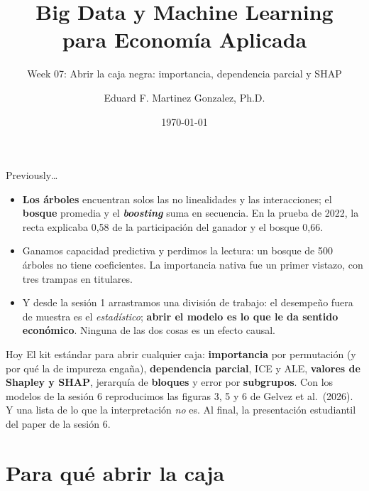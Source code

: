 \documentclass{beamer}
\title[BDML]{Big Data y Machine Learning \\ para Economía Aplicada}
\subtitle{Week 07: Abrir la caja negra: importancia, dependencia parcial y SHAP}
\author{Eduard F. Martinez Gonzalez, Ph.D.}
\institute[]{Departamento de Economía, Universidad Icesi}
\date{\today}
\newcommand{\1}{\mathbb{I}}
\begin{document}
\begin{frame}
\titlepage
\end{frame}

\begin{frame}{Previously\ldots}
\small
\begin{itemize}\itemsep4pt
  \item \textbf{Los árboles} encuentran solos las no linealidades y las interacciones; el \textbf{bosque} promedia y el \textbf{\emph{boosting}} suma en secuencia. En la prueba de 2022, la recta explicaba 0,58 de la participación del ganador y el bosque 0,66. \pause
  \item Ganamos capacidad predictiva y perdimos la lectura: un bosque de 500 árboles no tiene coeficientes. La importancia nativa fue un primer vistazo, con tres trampas en titulares. \pause
  \item Y desde la sesión 1 arrastramos una división de trabajo: el desempeño fuera de muestra es el \emph{estadístico}; \textbf{abrir el modelo es lo que le da sentido económico}. Ninguna de las dos cosas es un efecto causal.
\end{itemize}
\pause
\begin{block}{Hoy}
El kit estándar para abrir cualquier caja: \textbf{importancia} por permutación (y por qué la de impureza engaña), \textbf{dependencia parcial}, ICE y ALE, \textbf{valores de Shapley y SHAP}, jerarquía de \textbf{bloques} y error por \textbf{subgrupos}. Con los modelos de la sesión 6 reproducimos las figuras 3, 5 y 6 de Gelvez et al.\ (2026). Y una lista de lo que la interpretación \emph{no} es. Al final, la presentación estudiantil del paper de la sesión 6.
\end{block}
\end{frame}


\section{Para qué abrir la caja}
\begin{frame}[noframenumbering]
\tableofcontents[currentsection]
\end{frame}
\end{document}
